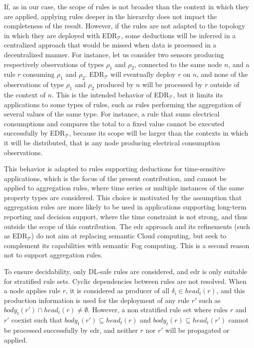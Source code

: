 \documentclass{iosart2c}
\newcommand{\edrt}{EDR$_{\mathcal{T}}$\xspace}
\begin{document}
If, as in our case, the scope of rules is not broader than the context in which they are applied, applying rules deeper in the hierarchy does not impact the completeness of the result.
However, if the rules are not adapted to the topology in which they are deployed with \edrt, some deductions will be inferred in a centralized approach that would be missed when data is processed in a decentralized manner. 
For instance, let us consider two sensors producing respectively observations of types $\rho_1$ and $\rho_2$, connected to the same node $n$, and a rule $r$ consuming $\rho_1$ and $\rho_2$.
\edrt will eventually deploy $r$ on $n$, and none of the observations of type $\rho_1$ and $\rho_2$ produced by $n$ will be processed by $r$ outside of the context of $n$.
This is the intended behavior of \edrt, but it limits its applications to some types of rules, such as rules performing the aggregation of several values of the same type.
For instance, a rule that sums electrical consumptions and compares the total to a fixed value cannot be executed successfully by \edrt, because its scope will be larger than the contexts in which it will be distributed, that is any node producing electrical consumption observations.

This behavior is adapted to rules supporting deductions for time-sensitive applications, which is the focus of the present contribution, and cannot be applied to aggregation rules, where time series or multiple instances of the same property types are considered.
This choice is motivated by the assumption that aggregation rules are more likely to be used in applications supporting long-term reporting and decision support, where the time constraint is not strong, and thus outside the scope of this contribution.
The \gls{edr} approach and its refinements (such as \edrt) do not aim at replacing semantic Cloud computing, but seek to complement its capabilities with semantic Fog computing. 
This is a second reason not to support aggregation rules.

To ensure decidability, only DL-safe rules are considered, and \gls{edr} is only suitable for stratified rule sets. 
Cyclic dependencies between rules are not resolved.
When a node applies rule $r$, it is considered as producer of all $\delta_i \in head_t(r)$, and this production information is used for the deployment of any rule $r'$ such as $body_t(r')\cap head_t(r)\neq \emptyset$.
However, a non stratified rule set where rules $r$ and $r'$ coexist such that $body_t(r')\subseteq head_t(r)$ and $body_t(r)\subseteq head_t(r')$ cannot be processed successfully by \gls{edr}, and neither $r$ nor $r'$ will be propagated or applied.
\end{document}
